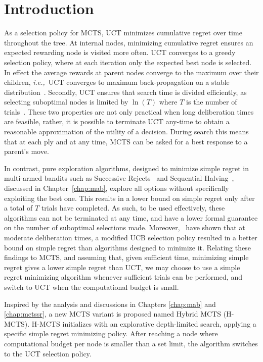\documentclass{kecsmstr}
\newcommand{\ie}{{\it i.e.,}~}
\begin{document}
\section{Introduction}
As a selection policy for MCTS, UCT minimizes cumulative regret over time throughout the tree. At internal nodes, minimizing cumulative regret ensures an expected rewarding node is visited more often. UCT converges to a greedy selection policy, where at each iteration only the expected best node is selected. In effect the average rewards at parent nodes converge to the maximum over their children, \ie UCT converges to maximum back-propagation on a stable distribution~. Secondly, UCT ensures that search time is divided efficiently, as selecting suboptimal nodes is limited by $\ln(T)$ where $T$ is the number of trials~. These two properties are not only practical when long deliberation times are feasible, rather, it is possible to terminate UCT any-time to obtain a reasonable approximation of the utility of a decision. During search this means that at each ply and at any time, MCTS can be asked for a best response to a parent's move.

In contrast, pure exploration algorithms, designed to minimize simple regret in multi-armed bandits such as Successive Rejects~ and Sequential Halving~, discussed in Chapter~\ref{chap:mab}, explore all options without specifically exploiting the best one. This results in a lower bound on simple regret only after a total of $T$ trials have completed. As such, to be used effectively, these algorithms can not be terminated at any time, and have a lower formal guarantee on the number of suboptimal selections made. Moreover,~ have shown that at moderate deliberation times, a modified UCB selection policy resulted in a better bound on simple regret than algorithms designed to minimize it. Relating these findings to MCTS, and assuming that, given sufficient time, minimizing simple regret gives a lower simple regret than UCT, we may choose to use a simple regret minimizing algorithm whenever sufficient trials can be performed, and switch to UCT when the computational budget is small.

Inspired by the analysis and discussions in Chapters \ref{chap:mab} and \ref{chap:mctssr}, a new MCTS variant is proposed named Hybrid MCTS (H-MCTS). H-MCTS initializes with an explorative depth-limited search, applying a specific simple regret minimizing policy. After reaching a node where computational budget per node is smaller than a set limit, the algorithm switches to the UCT selection policy. 
\vspace{2 mm}
\end{document}
